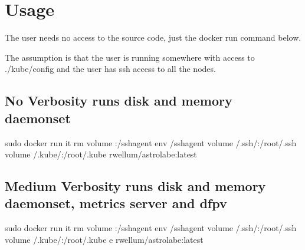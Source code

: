 \documentclass[letterpaper,10pt,english]{sphinxmanual}
\begin{document}
\section{Usage}
\label{\detokenize{README:usage}}
The user needs no access to the source code, just the docker run command below.

The assumption is that the user is running somewhere with access to
./kube/config and the user has ssh access to all the nodes.


\subsection{No Verbosity \sphinxhyphen{} runs disk and memory daemonset}
\label{\detokenize{README:no-verbosity-runs-disk-and-memory-daemonset}}
\begin{sphinxVerbatim}[commandchars=\\\{\}]
sudo docker run 
\PYGZhy{}it \PYGZhy{}\PYGZhy{}rm 
\PYGZhy{}\PYGZhy{}volume :/ssh\PYGZhy{}agent \PYGZhy{}\PYGZhy{}env /ssh\PYGZhy{}agent 
\PYGZhy{}\PYGZhy{}volume /.ssh/:/root/.ssh 
\PYGZhy{}\PYGZhy{}volume /.kube/:/root/.kube 
rwellum/astrolabe:latest
\end{sphinxVerbatim}


\subsection{Medium Verbosity \sphinxhyphen{} runs disk and memory daemonset, metrics server and df\sphinxhyphen{}pv}
\label{\detokenize{README:medium-verbosity-runs-disk-and-memory-daemonset-metrics-server-and-df-pv}}
\begin{sphinxVerbatim}[commandchars=\\\{\}]
sudo docker run 
\PYGZhy{}it \PYGZhy{}\PYGZhy{}rm 
\PYGZhy{}\PYGZhy{}volume :/ssh\PYGZhy{}agent \PYGZhy{}\PYGZhy{}env /ssh\PYGZhy{}agent 
\PYGZhy{}\PYGZhy{}volume /.ssh/:/root/.ssh 
\PYGZhy{}\PYGZhy{}volume /.kube/:/root/.kube 
\PYGZhy{}e  
rwellum/astrolabe:latest
\end{sphinxVerbatim}
\end{document}
